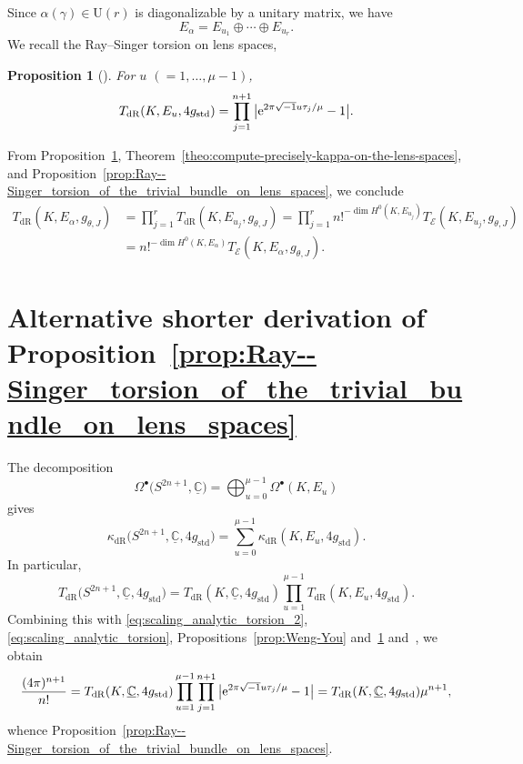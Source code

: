 \documentclass[pdftex]{sigma}
\numberwithin{equation}{section}
\newtheorem{Proposition}[Theorem]{Proposition}
 { \theoremstyle{definition}
\newtheorem{Definition}[Theorem]{Definition}
\newtheorem{Note}[Theorem]{Note}
\newtheorem{Example}[Theorem]{Example}
\newtheorem{Remark}[Theorem]{Remark} }
\newcommand{\ii}{\sqrt{-1}}
\newcommand{\deRham}{\mathrm{dR}}
\newcommand{\RN}{\cE}
\newcommand{\cE}{\mathcal{E}}
\begin{document}
Since $ \alpha (\gamma) \in \mathrm{U}(r)$
is diagonalizable by a unitary matrix,
we have
\[
 E_{\alpha}
 =
 E_{u_1}
 \oplus
 \cdots
 \oplus
 E_{u_r}
 .
\]
We recall the Ray--Singer torsion on lens spaces,
\begin{Proposition}[{\cite{Ray-70}}]
 \label{prop:Ray-70}
 For $u$ $(= 1 ,\ldots , \mu -1)$,
 \[
 T_{\deRham} ( K , E_{u}, 4 g_{\mathrm{std}} )
 =
 \prod_{j=1}^{n+1} \big| {\rm e}^{ 2 \pi \ii u {\tau}_j / \mu } -1 \big|
 .
 \]
\end{Proposition}
From Proposition~\ref{prop:Ray-70},
Theorem~\ref{theo:compute-precisely-kappa-on-the-lens-spaces},
and Proposition~\ref{prop:Ray--Singer_torsion_of_the_trivial_bundle_on_lens_spaces},
we conclude
\begin{align*}
 T_{\deRham} ( K , E_{\alpha}, g_{\theta , J} )
 & =
 \prod_{j=1}^r T_{\deRham} ( K , E_{u_j}, g_{\theta , J} )
 =
 \prod_{j=1}^r n!^{-\dim H^0 (K,E_{u_j})} T_{\RN} ( K , E_{u_j}, g_{\theta , J} )
 \\
 & =
 n!^{-\dim H^0 (K,E_{\alpha})} T_{\RN} ( K , E_{\alpha}, g_{\theta , J} )
 .
\end{align*}


\appendix

\section{Alternative shorter derivation of Proposition~\ref{prop:Ray--Singer_torsion_of_the_trivial_bundle_on_lens_spaces}}
The decomposition
\[
 \Omega^{\bullet} \big(S^{2n+1} , \underline{\mathbb{C}}\big)
 =
 \bigoplus_{u=0}^{\mu -1}
 \Omega^{\bullet} ( K , E_u )
\]
gives
\[
 \kappa_{\deRham} \big(S^{2n+1 } , \underline{\mathbb{C}} , 4 g_{\mathrm{std}}\big)
 =
 \sum_{u=0}^{\mu -1}
 \kappa_{\deRham} (K , E_u , 4 g_{\mathrm{std}})
 .
\]
In particular,
\[
 T_{\deRham} \big(S^{2n+1 } , \underline{\mathbb{C}} , 4 g_{\mathrm{std}}\big)
 =
 T_{\deRham} (K , \underline{\mathbb{C}} , 4 g_{\mathrm{std}})
 \prod_{u=1}^{\mu -1}
 T_{\deRham} (K , E_u , 4 g_{\mathrm{std}})
 .
\]
Combining this with \eqref{eq:scaling_analytic_torsion_2}, \eqref{eq:scaling_analytic_torsion}, Propositions~\ref{prop:Weng-You} and~\ref{prop:Ray-70} and~\cite{Melo-Spreafico-09}, we obtain
\[
 \frac{(4 \pi )^{n+1} }{ n!}
 =
 T_{\deRham} (K , \underline{\mathbb{C}} , 4 g_{\mathrm{std}})
 \prod_{u=1}^{\mu -1}
 \prod_{j=1}^{n+1}
 \big|
 {\rm e}^{2 \pi \sqrt{-1} u \tau_j / \mu } -1
 \big|
 =
 T_{\deRham} (K , \underline{\mathbb{C}} , 4 g_{\mathrm{std}})
 \mu^{n+1},
\]
whence Proposition~\ref{prop:Ray--Singer_torsion_of_the_trivial_bundle_on_lens_spaces}.
\end{document}
